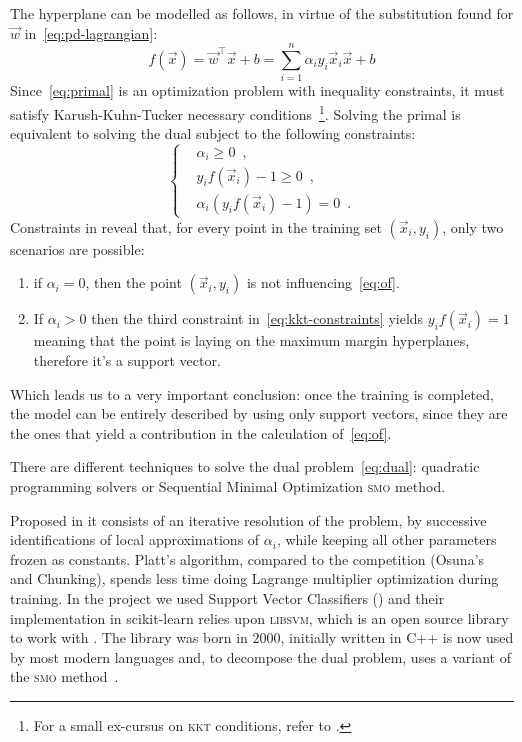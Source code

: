 The hyperplane can be modelled as follows, in virtue of the substitution found for $\vec{w}$
in~\ref{eq:pd-lagrangian}:
\begin{equation}
	\label{eq:of}
	f(\vec{x}) = \vec{w}^\top\vec{x} + b = \sum_{i = 1}^n\alpha_iy_i\vec{x}_i\vec{x} + b
\end{equation}
Since~\ref{eq:primal} is an optimization problem with inequality constraints, it must satisfy
Karush-Kuhn-Tucker necessary conditions~\cite{kkt1951}\footnote{For a small ex-cursus on
\textsc{kkt} conditions, refer to .}. Solving the primal is equivalent to solving the
dual subject to the following constraints:
\begin{equation}
	\label{eq:kkt-constraints}
	\begin{cases}
		 & \alpha_i \geq 0 \enspace,                   \\
		 & y_if(\vec{x}_i) - 1 \geq 0 \enspace,        \\
		 & \alpha_i(y_if(\vec{x}_i) - 1) = 0 \enspace.
	\end{cases}
\end{equation}
Constraints in  reveal that, for every point in the training set $(\vec{x}_i, y_i)$, only two scenarios are possible:
\begin{enumerate}
	\item if $\alpha_i = 0$, then the point $(\vec{x}_i, y_i)$ is not influencing~\ref{eq:of}.
	\item If $\alpha_i > 0$ then the third constraint in~\ref{eq:kkt-constraints} yields
		$y_if(\vec{x}_i) = 1$ meaning that the point is laying on the maximum margin hyperplanes, therefore it's a support vector.
\end{enumerate}
Which leads us to a very important conclusion: once the training is completed, the model can be entirely
described by using only support vectors, since they are the ones that yield a contribution in the
calculation of~\ref{eq:of}.

There are different techniques to solve the dual problem~\ref{eq:dual}: quadratic programming
solvers or Sequential Minimal Optimization \textsc{smo} method.

Proposed in \cite{platt1998} it consists of an iterative resolution of the problem, by successive
identifications of local approximations of $\alpha_i$, while keeping all other parameters frozen as
constants. Platt's algorithm, compared to the competition (Osuna's~\cite{osuna1997} and Chunking),
spends less time doing Lagrange multiplier optimization during training. In the project we used
Support Vector Classifiers (\svcs) and their implementation in scikit-learn relies upon
\textsc{libsvm}, which is an open source library to work with \svms. The library was born in $2000$,
initially written in C++ is now used by most modern languages and, to decompose the dual problem,
uses a variant of the \textsc{smo} method~\cite{fang2005}.

